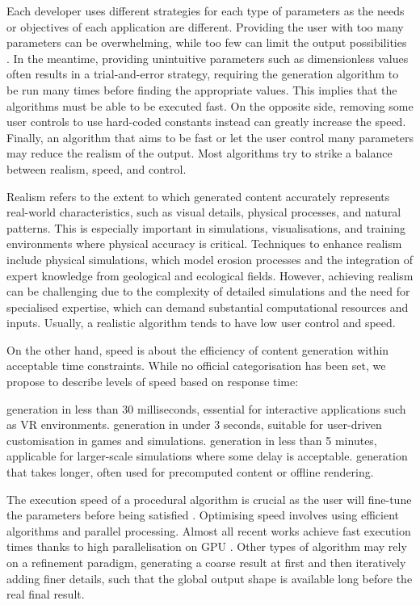 Each developer uses different strategies for each type of parameters as the needs or objectives of each application are different. Providing the user with too many parameters can be overwhelming, while too few can limit the output possibilities \cite{Togelius2013}. In the meantime, providing unintuitive parameters such as dimensionless values often results in a trial-and-error strategy, requiring the generation algorithm to be run many times before finding the appropriate values. This implies that the algorithms must be able to be executed fast. On the opposite side, removing some user controls to use hard-coded constants instead can greatly increase the speed. Finally, an algorithm that aims to be fast or let the user control many parameters may reduce the realism of the output. Most algorithms try to strike a balance between realism, speed, and control.

Realism refers to the extent to which generated content accurately represents real-world characteristics, such as visual details, physical processes, and natural patterns. This is especially important in simulations, visualisations, and training environments where physical accuracy is critical. Techniques to enhance realism include physical simulations, which model erosion processes and the integration of expert knowledge from geological and ecological fields. However, achieving realism can be challenging due to the complexity of detailed simulations and the need for specialised expertise, which can demand substantial computational resources and inputs. Usually, a realistic algorithm tends to have low user control and speed.

On the other hand, speed is about the efficiency of content generation within acceptable time constraints. While no official categorisation has been set, we propose to describe levels of speed based on response time:
\begin{Itemize}
     generation in less than 30 milliseconds, essential for interactive applications such as VR environments.
     generation in under 3 seconds, suitable for user-driven customisation in games and simulations.
     generation in less than 5 minutes, applicable for larger-scale simulations where some delay is acceptable.
     generation that takes longer, often used for precomputed content or offline rendering.
\end{Itemize}

The execution speed of a procedural algorithm is crucial as the user will fine-tune the parameters before being satisfied \cite{Smelik2014}.
Optimising speed involves using efficient algorithms and parallel processing. Almost all recent works achieve fast execution times thanks to high parallelisation on GPU \cite{Olsen2004}. Other types of algorithm may rely on a refinement paradigm, generating a coarse result at first and then iteratively adding finer details, such that the global output shape is available long before the real final result.


